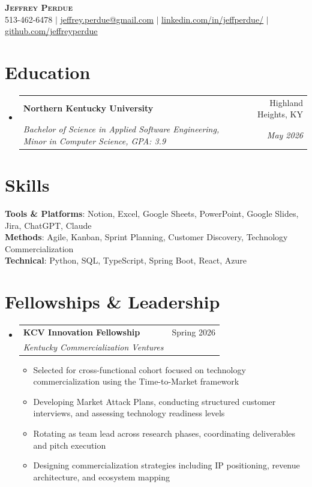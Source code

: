 \documentclass[letterpaper,11pt]{article}
\makeatletter
\newcommand{\resumeItem}[1]{
  \item\small{{#1 \vspace{-2pt}}}
}
\newcommand{\resumeSubheading}[4]{
  \vspace{-2pt}\item
    \begin{tabular*}{0.97\textwidth}[t]{l@{\extracolsep{\fill}}r}
      \textbf{#1} & #2 \\
      \textit{\small#3} & \textit{\small #4} \\
    \end{tabular*}\vspace{-7pt}
}
\newcommand{\resumeSubHeadingListStart}{\begin{itemize}[leftmargin=0.15in, label={}]}
\newcommand{\resumeSubHeadingListEnd}{\end{itemize}}
\newcommand{\resumeItemListStart}{\begin{itemize}}
\newcommand{\resumeItemListEnd}{\end{itemize}\vspace{-5pt}}
\makeatother
\begin{document}
\begin{center}
    \textbf{\Huge \scshape Jeffrey Perdue} \\ \vspace{1pt}
    \small 513-462-6478 $|$ \href{mailto:jeffrey.perdue@gmail.com}{\underline{jeffrey.perdue@gmail.com}} $|$
    \href{https://linkedin.com/in/jeffperdue/}{\underline{linkedin.com/in/jeffperdue/}} $|$
    \href{https://github.com/jeffreyperdue}{\underline{github.com/jeffreyperdue}}
\end{center}

\section{Education}
\resumeSubHeadingListStart
\resumeSubheading
{Northern Kentucky University}{Highland Heights, KY}
{Bachelor of Science in Applied Software Engineering, Minor in Computer Science, GPA: 3.9}{May 2026}
\resumeSubHeadingListEnd

\section{Skills}
\begin{itemize}[leftmargin=0.15in, label={}]
\small{\item{
\textbf{Tools \& Platforms}: Notion, Excel, Google Sheets, PowerPoint, Google Slides, Jira, ChatGPT, Claude \\
\textbf{Methods}: Agile, Kanban, Sprint Planning, Customer Discovery, Technology Commercialization \\
\textbf{Technical}: Python, SQL, TypeScript, Spring Boot, React, Azure
}}
\end{itemize}

\section{Fellowships \& Leadership}

\resumeSubHeadingListStart
\resumeSubheading
{KCV Innovation Fellowship}{Spring 2026}
{Kentucky Commercialization Ventures}{}
\resumeItemListStart
\resumeItem{Selected for cross-functional cohort focused on technology commercialization using the Time-to-Market framework}
\resumeItem{Developing Market Attack Plans, conducting structured customer interviews, and assessing technology readiness levels}
\resumeItem{Rotating as team lead across research phases, coordinating deliverables and pitch execution}
\resumeItem{Designing commercialization strategies including IP positioning, revenue architecture, and ecosystem mapping}
\resumeItemListEnd
\resumeSubHeadingListEnd
\end{document}

